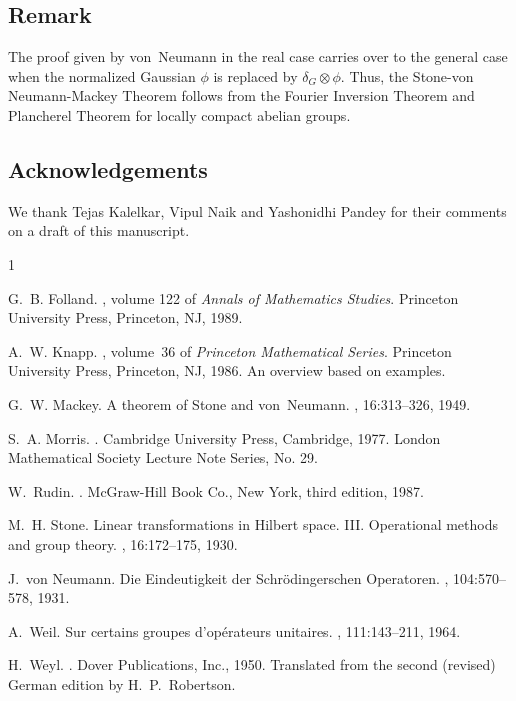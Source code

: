 \documentclass[11pt]{amsart}
\numberwithin{equation}{section}
\theoremstyle{plain}
\theoremstyle{definition}
\begin{document}
\subsection*{Remark}
The proof given by von~Neumann in the real case carries over to the general case when the normalized Gaussian $\phi$ is replaced by $\delta_G\otimes \phi$.
Thus, the Stone-von Neumann-Mackey Theorem follows from the Fourier Inversion Theorem and Plancherel Theorem for locally compact abelian groups.
\subsection*{Acknowledgements}
We thank Tejas Kalelkar, Vipul Naik and Yashonidhi Pandey for their comments on a draft of this manuscript.
\begin{thebibliography}{1}

G.~B. Folland.
, volume 122 of {\em Annals of
  Mathematics Studies}.
\newblock Princeton University Press, Princeton, NJ, 1989.

A.~W. Knapp.
, volume~36 of {\em
  Princeton Mathematical Series}.
\newblock Princeton University Press, Princeton, NJ, 1986.
\newblock An overview based on examples.

G.~W. Mackey.
\newblock A theorem of {S}tone and von~{N}eumann.
, 16:313--326, 1949.

S.~A. Morris.
.
\newblock Cambridge University Press, Cambridge, 1977.
\newblock London Mathematical Society Lecture Note Series, No. 29.

W.~Rudin.
.
\newblock McGraw-Hill Book Co., New York, third edition, 1987.

M.~H. Stone.
\newblock Linear transformations in {H}ilbert space. {III}. {O}perational
  methods and group theory.
, 16:172--175, 1930.

J.~von Neumann.
\newblock Die {E}indeutigkeit der {S}chr\"odingerschen {O}peratoren.
, 104:570--578, 1931.

A.~Weil.
\newblock Sur certains groupes d'op\'erateurs unitaires.
, 111:143--211, 1964.

H.~Weyl.
.
\newblock Dover Publications, Inc., 1950.
\newblock Translated from the second (revised) {G}erman edition by
  {H}.~{P}.~{R}obertson.

\end{thebibliography}
\end{document}
